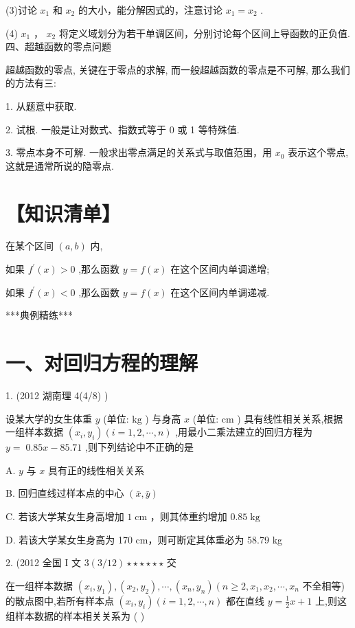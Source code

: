 \documentclass[10pt]{article}
\begin{document}
(3)讨论 \({x}_{1}\) 和 \({x}_{2}\) 的大小，能分解因式的，注意讨论 \({x}_{1} = {x}_{2}\) .

(4) \({x}_{1}\) ， \({x}_{2}\) 将定义域划分为若干单调区间，分别讨论每个区间上导函数的正负值. 四、超越函数的零点问题

超越函数的零点, 关键在于零点的求解, 而一般超越函数的零点是不可解, 那么我们的方法有三:

1. 从题意中获取.

2. 试根. 一般是让对数式、指数式等于 0 或 1 等特殊值.

3. 零点本身不可解. 一般求出零点满足的关系式与取值范围，用 \({x}_{0}\) 表示这个零点, 这就是通常所说的隐零点.

\section*{【知识清单】}

在某个区间 \(\left( {a,b}\right)\) 内,

如果 \({f}^{\prime }\left( x\right)  > 0\) ,那么函数 \(y = f\left( x\right)\) 在这个区间内单调递增;

如果 \({f}^{\prime }\left( x\right)  < 0\) ,那么函数 \(y = f\left( x\right)\) 在这个区间内单调递减.

***典例精练***

\section*{一、对回归方程的理解}

1. (2012 湖南理 4(4/8)            )

设某大学的女生体重 \(y\) (单位: \(\mathrm{{kg}}\) ) 与身高 \(x\) (单位: \(\mathrm{{cm}}\) ) 具有线性相关关系,根据一组样本数据 \(\left( {{x}_{i},{y}_{i}}\right) \left( {i = 1,2,\cdots ,n}\right)\) ,用最小二乘法建立的回归方程为 \(y = \; {0.85x} - {85.71}\) ,则下列结论中不正确的是

A. \(y\) 与 \(x\) 具有正的线性相关关系

B. 回归直线过样本点的中心 \(\left( {\bar{x},\bar{y}}\right)\)

C. 若该大学某女生身高增加 \(1\mathrm{\;{cm}}\) ，则其体重约增加 \({0.85}\mathrm{\;{kg}}\)

D. 若该大学某女生身高为 170 cm，则可断定其体重必为 58.79 kg

2. (2012 全国 I 文 \(3\left( {3/{12}}\right)  \star   \star   \star   \star   \star   \star\) 交

在一组样本数据 \(\left( {{x}_{i},{y}_{1}}\right) ,\left( {{x}_{2},{y}_{2}}\right) ,\cdots ,\left( {{x}_{n},{y}_{n}}\right) \left( {n \geq  2,{x}_{1},{x}_{2},\cdots ,{x}_{n}}\right.\) 不全相等) 的散点图中,若所有样本点 \(\left( {{x}_{i},{y}_{i}}\right) \left( {i = 1,2,\cdots ,n}\right)\) 都在直线 \(y = \frac{1}{2}x + 1\) 上,则这组样本数据的样本相关关系为 ( )
\end{document}

